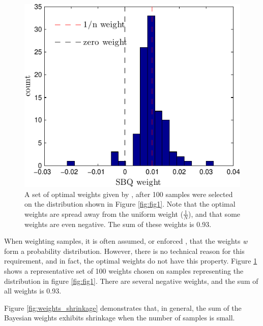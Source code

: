 \documentclass[]{article}
\begin{document}
\begin{figure}
\centering
\includegraphics[width=\columnwidth]{figures/weights_v1_n100}
\caption{A set of optimal weights given by \bq{}, after 100 \sbq{} samples were selected on the distribution shown in Figure \ref{fig:fig1}.  Note that the optimal weights are spread away from the uniform weight ($\frac{1}{N}$), and that some weights are even negative.  The sum of these weights is 0.93.}
\label{fig:weights100}
\end{figure}

When weighting samples, it is often assumed, or enforced \citep[as in][]{bach2012equivalence,Song2008}, that the weights ${w}$ form a probability distribution.  However, there is no technical reason for this requirement, and in fact, the optimal weights do not have this property.  Figure \ref{fig:weights100} shows a representative set of 100 \bq{} weights chosen on samples representing the distribution in figure \ref{fig:fig1}.  There are several negative weights, and the sum of all weights is 0.93.

Figure \ref{fig:weights_shrinkage} demonstrates that, in general, the sum of the Bayesian weights exhibits shrinkage when the number of samples is small.
\end{document}
